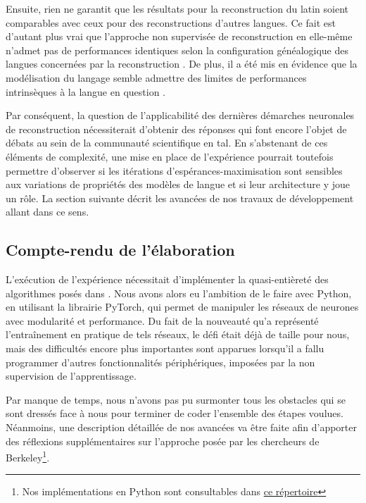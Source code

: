 \documentclass[12pt, twoside]{report}
\begin{document}
Ensuite, rien ne garantit que les résultats pour la reconstruction du latin soient comparables avec ceux pour des reconstructions d'autres langues. Ce fait est d'autant plus vrai que l'approche non supervisée de reconstruction en elle-même n'admet pas de performances identiques selon la configuration généalogique des langues concernées par la reconstruction \autocite[section :  Limitations]{he2022neural}. De plus, il a été mis en évidence que la modélisation du langage semble admettre des limites de performances intrinsèques à la langue en question \autocite{cotterell-etal-2018-languages}.

\vspace{12pt}
Par conséquent, la question de l'applicabilité des dernières démarches neuronales de reconstruction nécessiterait d'obtenir des réponses qui font encore l'objet de débats au sein de la communauté scientifique en \Gls{tal}. En s'abstenant de ces éléments de complexité, une mise en place de l'expérience pourrait toutefois permettre d'observer si les itérations d'espérances-maximisation sont sensibles aux variations de propriétés des modèles de langue et si leur architecture y joue un rôle. La section suivante décrit les avancées de nos travaux de développement allant dans ce sens.

\subsection{Compte-rendu de l'élaboration}

L'exécution de l'expérience nécessitait d'implémenter la quasi-entièreté des algorithmes posés dans \cite{he2022neural}. Nous avons alors eu l'ambition de le faire avec Python, en utilisant la librairie PyTorch, qui permet de manipuler les réseaux de neurones avec modularité et performance. Du fait de la nouveauté qu'a représenté l'entraînement en pratique de tels réseaux, le défi était déjà de taille pour nous, mais des difficultés encore plus importantes sont apparues lorsqu'il a fallu programmer d'autres fonctionnalités périphériques, imposées par la non supervision de l'apprentissage.

Par manque de temps, nous n'avons pas pu surmonter tous les obstacles qui se sont dressés face à nous pour terminer de coder l'ensemble des étapes voulues. Néanmoins, une description détaillée de nos avancées va être faite afin d'apporter des réflexions supplémentaires sur l'approche posée par les chercheurs de Berkeley\footnote{Nos implémentations en Python sont consultables dans \href{https://github.com/Convolutio/IA_languesAnciennes/tree/master/Code/Unsupervised_reconstruction}{ce répertoire}}.
\end{document}
